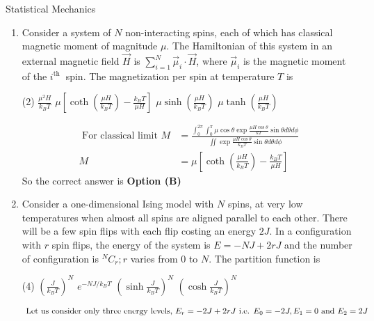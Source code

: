 \begin{abox}
	Statistical Mechanics
\end{abox}
\begin{enumerate}
	\item Consider a system of $N$ non-interacting spins, each of which has classical magnetic moment of magnitude $\mu$. The Hamiltonian of this system in an external magnetic field $\vec{H}$ is $\sum_{i=1}^{N} \vec{\mu}_{i} \cdot \vec{H}$, where $\vec{\mu}_{i}$ is the magnetic moment of the $i^{\text {th }}$ spin. The magnetization per spin at temperature $T$ is
	{}
\begin{tasks}(2)
\task[\textbf{A.}] $\frac{\mu^{2} H}{k_{B} T}$
\task[\textbf{B.}] $\mu\left[\operatorname{coth}\left(\frac{\mu H}{k_{B} T}\right)-\frac{k_{B} T}{\mu H}\right]$
\task[\textbf{C.}]  $\mu \sinh \left(\frac{\mu H}{k_{B} T}\right)$
\task[\textbf{D.}]  $\mu \tanh \left(\frac{\mu H}{k_{B} T}\right)$
\end{tasks}
\begin{answer}
\begin{align*}
\text{	For classical limit }M&=\frac{\int_{0}^{2 \pi} \int_{0}^{\pi} \mu \cos \theta \exp \frac{\mu H \cos \theta}{k T} \sin \theta d \theta d \phi}{\iint \exp \frac{\mu H \cos \theta}{k_{B} T} \sin \theta d \theta d \phi}\\
M&=\mu\left[\operatorname{coth}\left(\frac{\mu H}{k_{B} T}\right)-\frac{k_{B} T}{\mu H}\right]
\end{align*}
So the correct answer is \textbf{Option (B)}
\end{answer}
	\item  Consider a one-dimensional Ising model with $N$ spins, at very low temperatures when almost all spins are aligned parallel to each other. There will be a few spin flips with each flip costing an energy $2 J .$ In a configuration with $r$ spin flips, the energy of the system is $E=-N J+2 r J$ and the number of configuration is ${ }^{N} C_{r} ; r$ varies from 0 to $N$. The partition function is
{	}
\begin{tasks}(4)
\task[\textbf{A.}] $\left(\frac{J}{k_{B} T}\right)^{N}$
\task[\textbf{B.}]  $e^{-N J / k_{B} T}$
\task[\textbf{C.}] $\left(\sinh \frac{J}{k_{B} T}\right)^{N}$
\task[\textbf{D.}] $\left(\cosh \frac{J}{k_{B} T}\right)^{N}$
\end{tasks}
\begin{answer}
\begin{align*}
\intertext{ Let us consider only three energy levels, $E_{r}=-2 J+2 r J$ i.e. $E_{0}=-2 J, E_{1}=0$ and $E_{2}=2 J$ }

\end{align*}
\end{answer}
\end{enumerate}

